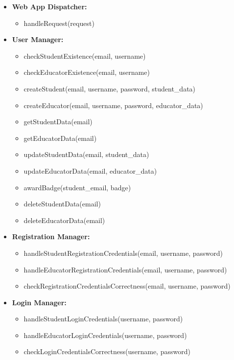  \begin{itemize}

    \item \textbf{Web App Dispatcher:}
    \begin{itemize}
     \item handleRequest(request)
    \end{itemize}
    
    \item \textbf{User Manager:}
    \begin{itemize}
     \item checkStudentExistence(email, username)
     \item checkEducatorExistence(email, username)
     \item createStudent(email, username, password, student\_data)
     \item createEducator(email, username, password, educator\_data)
     \item getStudentData(email)
     \item getEducatorData(email)
     \item updateStudentData(email, student\_data)
     \item updateEducatorData(email, educator\_data)
     \item awardBadge(student\_email, badge)
     \item deleteStudentData(email)
     \item deleteEducatorData(email)
    \end{itemize}

    \item \textbf{Registration Manager:}
    \begin{itemize}
     \item handleStudentRegistrationCredentials(email, username, password)
     \item handleEducatorRegistrationCredentials(email, username, password)
     \item checkRegistrationCredentialsCorrectness(email, username, password)
    \end{itemize}

    \item \textbf{Login Manager:}
    \begin{itemize}
     \item handleStudentLoginCredentials(username, password)
     \item handleEducatorLoginCredentials(username, password)
     \item checkLoginCredentialsCorrectness(username, password)
    \end{itemize}


\end{itemize}
